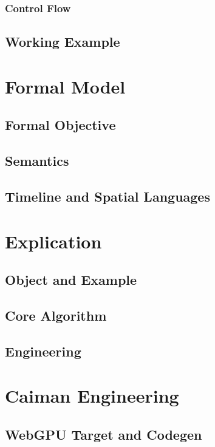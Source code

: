 \subsubsection{Control Flow}

\subsection{Working Example}

\section{Formal Model}
\label{sec:formal}

\subsection{Formal Objective}

\subsection{Semantics}

\subsection{Timeline and Spatial Languages}

\section{Explication}
\label{sec:explication}

\subsection{Object and Example}

\subsection{Core Algorithm}

\subsection{Engineering}

\section{Caiman Engineering}
\label{sec:engineering}

\subsection{WebGPU Target and Codegen}

